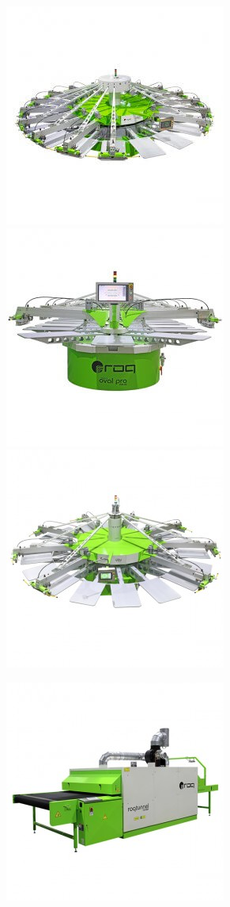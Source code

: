 \begin{frame}
\begin{figure}[ht]
\begin{center}
\includegraphics[scale=0.2]{"./image/ROQ/maquinas/NEXTP18-600x6001-275x275.jpg"}
\includegraphics[scale=0.2]{"./image/ROQ/maquinas/PRO-600x600-275x275.jpg"}
\includegraphics[scale=0.2]{"./image/ROQ/maquinas/You-600x600-275x275"}
\end{center}
\begin{center}
\includegraphics[scale=0.2]{"./image/ROQ/maquinas/T3018GP_600x600-275x275.jpg"}

\end{center}
\end{figure}
\end{frame}
